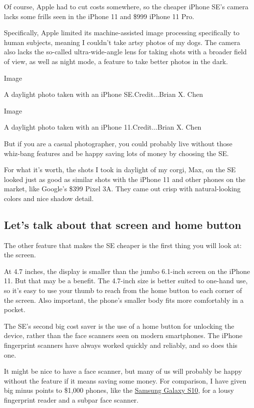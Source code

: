 Of course, Apple had to cut costs somewhere, so the cheaper iPhone SE's
camera lacks some frills seen in the iPhone 11 and \$999 iPhone 11 Pro.

Specifically, Apple limited its machine-assisted image processing
specifically to human subjects, meaning I couldn't take artsy photos of
my dogs. The camera also lacks the so-called ultra-wide-angle lens for
taking shots with a broader field of view, as well as night mode, a
feature to take better photos in the dark.

Image

A daylight photo taken with an iPhone SE.Credit...Brian X. Chen

Image

A daylight photo taken with an iPhone 11.Credit...Brian X. Chen

But if you are a casual photographer, you could probably live without
those whiz-bang features and be happy saving lots of money by choosing
the SE.

For what it's worth, the shots I took in daylight of my corgi, Max, on
the SE looked just as good as similar shots with the iPhone 11 and other
phones on the market, like Google's \$399 Pixel 3A. They came out crisp
with natural-looking colors and nice shadow detail.

\hypertarget{lets-talk-about-that-screen-and-home-button}{%
\subsection{Let's talk about that screen and home
button}\label{lets-talk-about-that-screen-and-home-button}}

The other feature that makes the SE cheaper is the first thing you will
look at: the screen.

At 4.7 inches, the display is smaller than the jumbo 6.1-inch screen on
the iPhone 11. But that may be a benefit. The 4.7-inch size is better
suited to one-hand use, so it's easy to use your thumb to reach from the
home button to each corner of the screen. Also important, the phone's
smaller body fits more comfortably in a pocket.

The SE's second big cost saver is the use of a home button for unlocking
the device, rather than the face scanners seen on modern smartphones.
The iPhone fingerprint scanners have always worked quickly and reliably,
and so does this one.

It might be nice to have a face scanner, but many of us will probably be
happy without the feature if it means saving some money. For comparison,
I have given big minus points to \$1,000 phones, like the
\href{https://www.nytimes3xbfgragh.onion/2019/02/27/technology/personaltech/samsung-galaxy-s10-review.html}{Samsung
Galaxy S10}, for a lousy fingerprint reader and a subpar face scanner.

